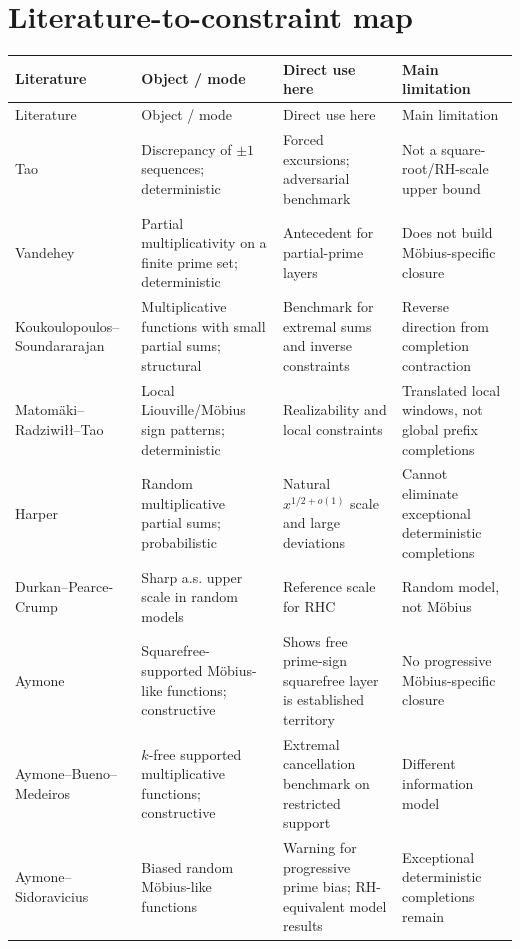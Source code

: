 \documentclass[11pt]{article}
\begin{document}
\section{Literature-to-constraint map}
\small
\setlength{\tabcolsep}{4pt}
\begin{longtable}{p{}p{}p{}p{}}
\toprule
Literature & Object / mode & Direct use here & Main limitation \\
\midrule
\endfirsthead
\toprule
Literature & Object / mode & Direct use here & Main limitation \\
\midrule
\endhead
Tao \cite{Tao2016} & Discrepancy of $\pm1$ sequences; deterministic & Forced excursions; adversarial benchmark & Not a square-root/RH-scale upper bound \\
Vandehey \cite{Vandehey2012} & Partial multiplicativity on a finite prime set; deterministic & Antecedent for partial-prime layers & Does not build Möbius-specific closure \\
Koukoulopoulos--Soundararajan \cite{KoukSound2020} & Multiplicative functions with small partial sums; structural & Benchmark for extremal sums and inverse constraints & Reverse direction from completion contraction \\
Matomäki--Radziwiłł--Tao \cite{MRT2016} & Local Liouville/Möbius sign patterns; deterministic & Realizability and local constraints & Translated local windows, not global prefix completions \\
Harper \cite{Harper2023,Harper2019} & Random multiplicative partial sums; probabilistic & Natural $x^{1/2+o(1)}$ scale and large deviations & Cannot eliminate exceptional deterministic completions \\
Durkan--Pearce-Crump \cite{DurkanPearceCrump2026} & Sharp a.s. upper scale in random models & Reference scale for RHC & Random model, not Möbius \\
Aymone \cite{Aymone2020} & Squarefree-supported Möbius-like functions; constructive & Shows free prime-sign squarefree layer is established territory & No progressive Möbius-specific closure \\
Aymone--Bueno--Medeiros \cite{AymoneBuenoMedeiros2022} & $k$-free supported multiplicative functions; constructive & Extremal cancellation benchmark on restricted support & Different information model \\
Aymone--Sidoravicius \cite{AymoneSidoravicius2017} & Biased random Möbius-like functions & Warning for progressive prime bias; RH-equivalent model results & Exceptional deterministic completions remain \\

\end{longtable}
\end{document}
